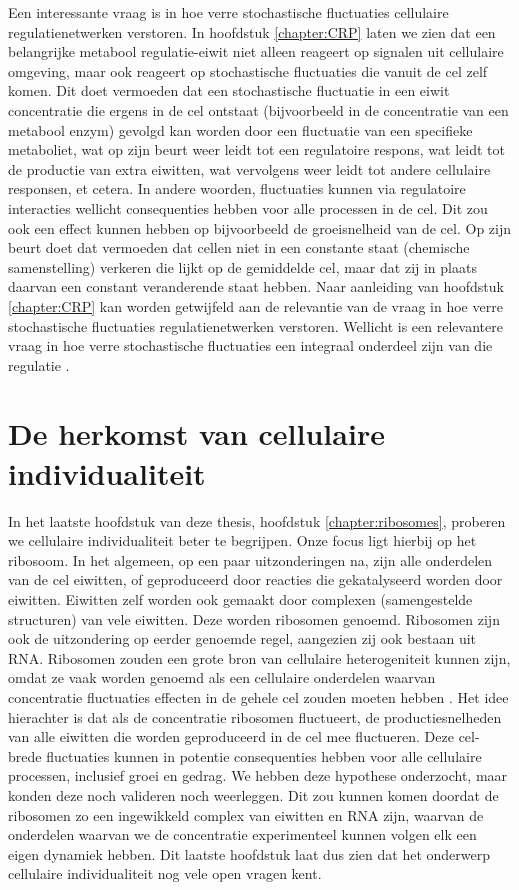 Een interessante vraag is in hoe verre stochastische fluctuaties cellulaire regulatienetwerken verstoren. 
%
In hoofdstuk \ref{chapter:CRP} laten we zien dat een belangrijke metabool regulatie-eiwit niet alleen reageert op signalen uit cellulaire omgeving, 
maar ook reageert op stochastische fluctuaties die vanuit de cel zelf komen.
%
Dit doet vermoeden dat een stochastische fluctuatie in een eiwit concentratie die ergens in de cel ontstaat (bijvoorbeeld in de concentratie van een metabool enzym) gevolgd kan worden door een fluctuatie van een specifieke metaboliet, wat op zijn beurt weer leidt tot een regulatoire respons, wat leidt tot de productie van extra eiwitten, wat vervolgens weer leidt tot andere cellulaire responsen, et cetera. 
%
In andere woorden, fluctuaties kunnen via regulatoire interacties wellicht consequenties hebben voor alle processen in de cel.
Dit zou ook een effect kunnen hebben op bijvoorbeeld de groeisnelheid van de cel.
%
Op zijn beurt doet dat vermoeden dat cellen niet in een constante staat (chemische samenstelling) verkeren die lijkt op de gemiddelde cel, 
maar dat zij in plaats daarvan een constant veranderende staat hebben.
%
Naar aanleiding van hoofdstuk \ref{chapter:CRP} kan worden getwijfeld aan de relevantie van de vraag in hoe verre stochastische fluctuaties regulatienetwerken verstoren.
Wellicht is een relevantere vraag in hoe verre stochastische fluctuaties een integraal onderdeel zijn van die regulatie \cite{Wollman2018}.


\section{De herkomst van cellulaire individualiteit}

In het laatste hoofdstuk van deze thesis, hoofdstuk \ref{chapter:ribosomes}, proberen we cellulaire individualiteit beter te begrijpen.
%
Onze focus ligt hierbij op het ribosoom.
%
In het algemeen, op een paar uitzonderingen na, zijn alle onderdelen van de cel eiwitten, of geproduceerd door reacties die gekatalyseerd worden door eiwitten. 
Eiwitten zelf worden ook gemaakt door complexen (samengestelde structuren) van vele eiwitten. Deze worden ribosomen genoemd.
%
Ribosomen zijn ook de uitzondering op eerder genoemde regel, aangezien zij ook bestaan uit RNA.
%
Ribosomen zouden een grote bron van cellulaire heterogeniteit kunnen zijn, omdat ze vaak worden genoemd als een cellulaire onderdelen waarvan concentratie fluctuaties effecten in de gehele cel zouden moeten hebben \cite{Davidson2008, Raj2008, Chalancon2012, Bruggeman2018}.
%
Het idee hierachter is dat als de concentratie ribosomen fluctueert, de productiesnelheden van alle eiwitten die worden geproduceerd in de cel mee fluctueren. 
%
Deze cel-brede fluctuaties kunnen in potentie consequenties hebben voor alle cellulaire processen, 
inclusief groei en gedrag.
%
We hebben deze hypothese onderzocht, maar konden deze noch valideren noch weerleggen.
%
Dit zou kunnen komen doordat de ribosomen zo een ingewikkeld complex van eiwitten en RNA zijn, waarvan de onderdelen waarvan we de concentratie experimenteel kunnen volgen elk een eigen dynamiek hebben.
%
Dit laatste hoofdstuk laat dus zien dat het onderwerp cellulaire individualiteit nog vele open vragen kent.




